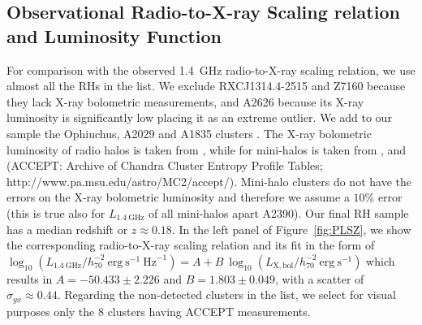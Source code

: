 \documentclass[traditabstract]{aa}
\newcommand{\rmn}{\mathrm}
\begin{document}
\begin{appendix}



\section{Observational Radio-to-X-ray Scaling relation and Luminosity Function}
\label{app:D}

For comparison with the observed 1.4~GHz radio-to-X-ray scaling relation, we use almost all the RHs in the \cite{2011A&A...527A..99E} list. We exclude RXCJ1314.4-2515 and Z7160 because they lack X-ray bolometric measurements, and A2626 because its X-ray luminosity is significantly low placing it as an extreme outlier. We add to our sample the Ophiuchus, A2029 and A1835 clusters \citep{2009A&A...499..371G}. The X-ray bolometric luminosity of radio halos is taken from \cite{2009A&A...507..661B}, while for mini-halos is taken from \cite{2002ApJ...567..716R}, \cite{Boehringer:1998vv} and \cite{2009ApJS..182...12C} (ACCEPT: Archive of Chandra Cluster Entropy Profile Tables; http://www.pa.msu.edu/astro/MC2/accept/).
Mini-halo clusters do not have the errors on the X-ray bolometric luminosity and therefore we assume a $10\%$ error (this is true also for $L_{1.4~\rmn{GHz}}$ of all mini-halos apart A2390). Our final RH sample has a median redshift or $z\approx0.18$. In the left panel of Figure~\ref{fig:PLSZ}, we show the corresponding radio-to-X-ray scaling relation and its fit in the form of $\log_{10} (L_{1.4~\rmn{GHz}}/h_{70}^{-2}~\rmn{erg}~\rmn{s}^{-1}~\rmn{Hz}^{-1}) = A + B~\log_{10} (L_{ \rmn{X,bol}}/h_{70}^{-2}~\rmn{erg}~\rmn{s}^{-1})$ which results in $A=-50.433\pm2.226$ and $B=1.803\pm0.049$, with a scatter of $\sigma_{yx} \approx 0.44$. Regarding the non-detected clusters in the \cite{2011A&A...527A..99E} list, we select for visual purposes only the 8 clusters having ACCEPT measurements. 


\end{appendix}
\end{document}
